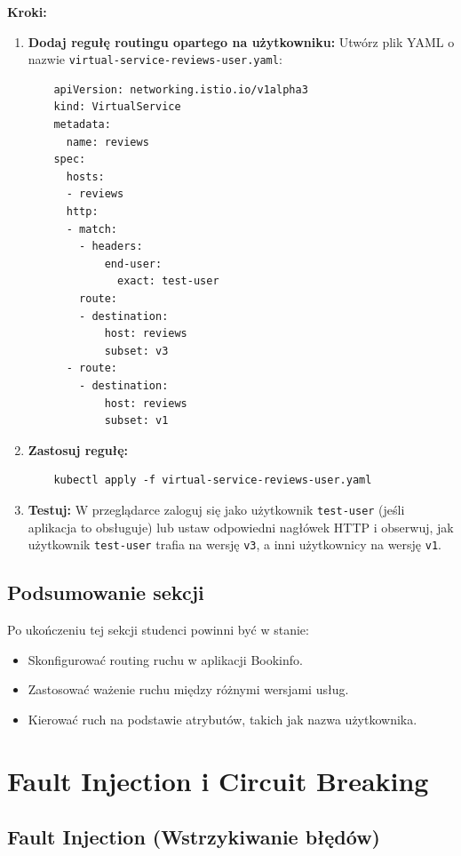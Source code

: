 \documentclass{article}
\begin{document}
\textbf{Kroki:}
\begin{enumerate}
    \item \textbf{Dodaj regułę routingu opartego na użytkowniku:}
    Utwórz plik YAML o nazwie \texttt{virtual-service-reviews-user.yaml}:
    \begin{lstlisting}
    apiVersion: networking.istio.io/v1alpha3
    kind: VirtualService
    metadata:
      name: reviews
    spec:
      hosts:
      - reviews
      http:
      - match:
        - headers:
            end-user:
              exact: test-user
        route:
        - destination:
            host: reviews
            subset: v3
      - route:
        - destination:
            host: reviews
            subset: v1
    \end{lstlisting}

    \item \textbf{Zastosuj regułę:}
    \begin{lstlisting}
    kubectl apply -f virtual-service-reviews-user.yaml
    \end{lstlisting}

    \item \textbf{Testuj:}
    W przeglądarce zaloguj się jako użytkownik \texttt{test-user} (jeśli aplikacja to obsługuje) lub ustaw odpowiedni nagłówek HTTP i obserwuj, jak użytkownik \texttt{test-user} trafia na wersję \texttt{v3}, a inni użytkownicy na wersję \texttt{v1}.
\end{enumerate}

\subsection{Podsumowanie sekcji}

Po ukończeniu tej sekcji studenci powinni być w stanie:
\begin{itemize}
    \item Skonfigurować routing ruchu w aplikacji Bookinfo.
    \item Zastosować ważenie ruchu między różnymi wersjami usług.
    \item Kierować ruch na podstawie atrybutów, takich jak nazwa użytkownika.
\end{itemize}

\section{Fault Injection i Circuit Breaking}

\subsection{Fault Injection (Wstrzykiwanie błędów)}
\end{document}
